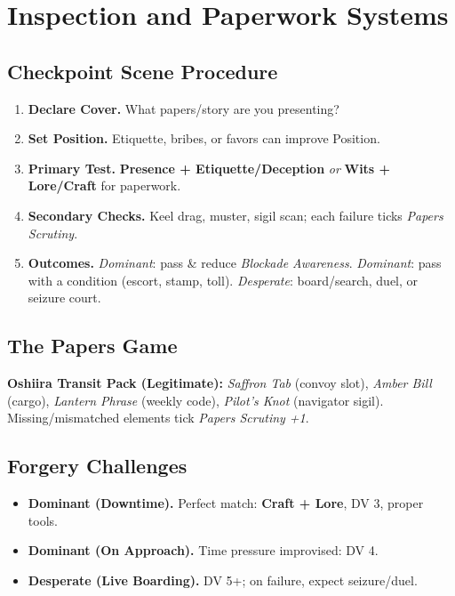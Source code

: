 \documentclass[11pt,oneside]{book}
\begin{document}
\section{Inspection and Paperwork Systems}

\subsection*{Checkpoint Scene Procedure}
\begin{enumerate}[leftmargin=*,itemsep=2pt]
  \item \textbf{Declare Cover.} What papers/story are you presenting?
  \item \textbf{Set Position.} Etiquette, bribes, or favors can improve Position.
  \item \textbf{Primary Test.} \textbf{Presence + Etiquette/Deception} \emph{or} \textbf{Wits + Lore/Craft} for paperwork.
  \item \textbf{Secondary Checks.} Keel drag, muster, sigil scan; each failure ticks \textit{Papers Scrutiny}.
  \item \textbf{Outcomes.} \emph{Dominant}: pass \& reduce \textit{Blockade Awareness}. \emph{Dominant}: pass with a condition (escort, stamp, toll). \emph{Desperate}: board/search, duel, or seizure court.
\end{enumerate}

\subsection*{The Papers Game}
\textbf{Oshiira Transit Pack (Legitimate):} \emph{Saffron Tab} (convoy slot), \emph{Amber Bill} (cargo), \emph{Lantern Phrase} (weekly code), \emph{Pilot's Knot} (navigator sigil). Missing/mismatched elements tick \textit{Papers Scrutiny +1}.

\subsection*{Forgery Challenges}
\begin{itemize}
  \item \textbf{Dominant (Downtime).} Perfect match: \textbf{Craft + Lore}, DV 3, proper tools.
  \item \textbf{Dominant (On Approach).} Time pressure improvised: DV 4.
  \item \textbf{Desperate (Live Boarding).} DV 5+; on failure, expect seizure/duel.
\end{itemize}
\end{document}

